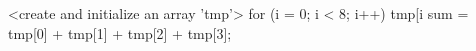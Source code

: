 <create and initialize an array 'tmp'>
for (i = 0; i < 8; i++)
   tmp[i %
sum = tmp[0] + tmp[1] + tmp[2] + tmp[3];
